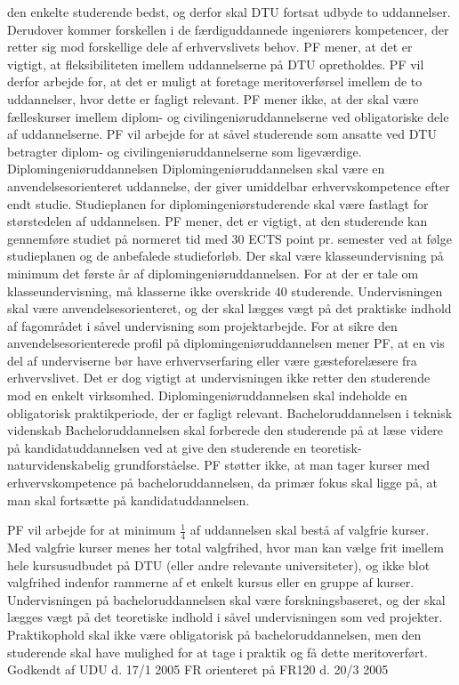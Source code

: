 den enkelte studerende bedst, og derfor skal DTU fortsat udbyde to uddannelser. Derudover kommer forskellen i de
færdiguddannede ingeniørers kompetencer, der retter sig mod forskellige dele af erhvervslivets behov.
PF mener, at det er vigtigt, at fleksibiliteten imellem uddannelserne på DTU opretholdes. PF vil derfor arbejde for, at
det er muligt at foretage meritoverførsel imellem de to uddannelser, hvor dette er fagligt relevant.
PF mener ikke, at der skal være fælleskurser imellem diplom- og civilingeniøruddannelserne ved obligatoriske dele af
uddannelserne.
PF vil arbejde for at såvel studerende som ansatte ved DTU betragter diplom- og civilingeniøruddannelserne som
ligeværdige.
Diplomingeniøruddannelsen
Diplomingeniøruddannelsen skal være en anvendelsesorienteret uddannelse, der giver umiddelbar erhvervskompetence
efter endt studie. Studieplanen for diplomingeniørstuderende skal være fastlagt for størstedelen af uddannelsen. PF
mener, det er vigtigt, at den studerende kan gennemføre studiet på normeret tid med 30 ECTS point pr. semester ved at
følge studieplanen og de anbefalede studieforløb.
Der skal være klasseundervisning på minimum det første år af diplomingeniøruddannelsen. For at der er tale om
klasseundervisning, må klasserne ikke overskride 40 studerende. Undervisningen skal være anvendelsesorienteret, og
der skal lægges vægt på det praktiske indhold af fagområdet i såvel undervisning som projektarbejde.
For at sikre den anvendelsesorienterede profil på diplomingeniøruddannelsen mener PF, at en vis del af underviserne
bør have erhvervserfaring eller være gæsteforelæsere fra erhvervslivet. Det er dog vigtigt at undervisningen ikke retter
den studerende mod en enkelt virksomhed. Diplomingeniøruddannelsen skal indeholde en obligatorisk praktikperiode,
der er fagligt relevant.
Bacheloruddannelsen i teknisk videnskab
Bacheloruddannelsen skal forberede den studerende på at læse videre på kandidatuddannelsen ved at give den
studerende en teoretisk-naturvidenskabelig grundforståelse. PF støtter ikke, at man tager kurser med
erhvervskompetence på bacheloruddannelsen, da primær fokus skal ligge på, at man skal fortsætte på
kandidatuddannelsen.

PF vil arbejde for at minimum $\frac{1}{4}$ af uddannelsen skal bestå af valgfrie kurser. Med valgfrie kurser menes her total
valgfrihed, hvor man kan vælge frit imellem hele kursusudbudet på DTU (eller andre relevante universiteter), og ikke
blot valgfrihed indenfor rammerne af et enkelt kursus eller en gruppe af kurser.
Undervisningen på bacheloruddannelsen skal være forskningsbaseret, og der skal lægges vægt på det teoretiske indhold
i såvel undervisningen som ved projekter. Praktikophold skal ikke være obligatorisk på bacheloruddannelsen, men den
studerende skal have mulighed for at tage i praktik og få dette meritoverført.
Godkendt af UDU d. 17/1 2005
FR orienteret på FR120 d. 20/3 2005
